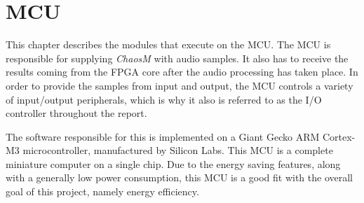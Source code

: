 
\clearpage
\section{MCU} \label{section:mcu}

This chapter describes the modules that execute on the MCU. The MCU is
responsible for supplying \textit{ChaosM} with audio samples. It also has to
receive the results coming from the FPGA core after the audio processing has
taken place. In order to provide the samples from input and output, the MCU
controls a variety of input/output peripherals, which is why it also is referred to as the I/O controller throughout the report.

The software responsible for this is implemented on a Giant Gecko ARM Cortex-M3
microcontroller, manufactured by Silicon Labs. This MCU is a complete miniature
computer on a single chip. Due to the energy saving features, along with a
generally low power consumption, this MCU is a good fit with the overall goal
of this project, namely energy efficiency.







